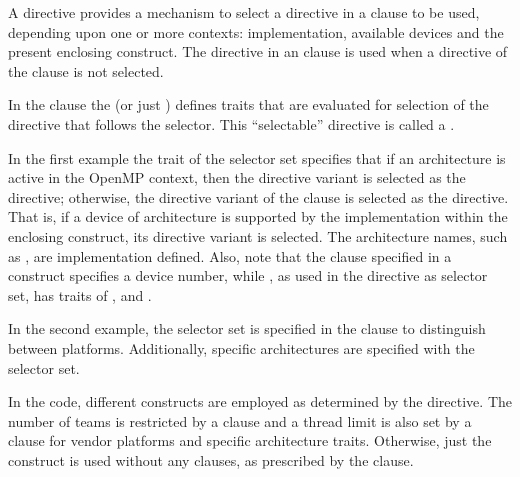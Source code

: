 A  directive provides a mechanism to select a directive in
a  clause to be used, depending upon one or more contexts:  
implementation, available devices and the present enclosing construct. 
The directive in an  clause is used when a directive of the 
 clause is not selected.

In the  clause the  (or just ) defines traits that are
evaluated for selection of the directive that follows the selector. 
This ``selectable'' directive is called a .

In the first example the  trait of the
 selector set specifies that if an  architecture is
active in the OpenMP context, then the 
directive variant is selected as the directive; otherwise, the 
directive variant of the  clause is selected as the directive.
That is, if a device of  architecture is supported by the implementation within
the enclosing  construct, its directive variant is selected.
The architecture names, such as , are implementation defined.
Also, note that the  clause specified in a  construct specifies
a device number, while , as used in the 
directive as selector set, has traits of ,  and .




In the second example, the  selector set is specified
in the  clause to distinguish between platforms. 
Additionally, specific architectures are specified with the 
selector set.

In the code, different  constructs are employed as determined
by the  directive.
The number of teams is restricted by a  clause
and a thread limit is also set by a  clause for 
vendor platforms and specific architecture
traits.  Otherwise, just the  construct is used without
any clauses, as prescribed by the  clause.


